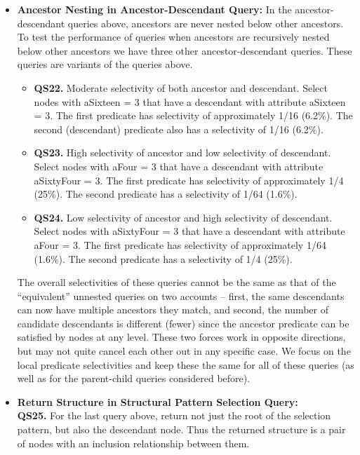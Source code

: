 \begin{itemize}
\item {\bf Ancestor Nesting in Ancestor-Descendant Query:}
In the ancestor-descendant queries above, ancestors are never nested below
other ancestors.  To test the performance of queries when ancestors are
recursively nested below other ancestors we have three other
ancestor-descendant queries.  These queries are variants of the queries
above.

\begin{itemize}
\item {\bf QS22.} Moderate selectivity of both ancestor and descendant.
Select nodes with {\sf aSixteen = 3} that have a descendant with attribute {\sf
aSixteen = 3}.  The first predicate has selectivity of approximately 1/16 (6.2\%).
The second (descendant) predicate also has a selectivity of 1/16 (6.2\%).

\item {\bf QS23.} High selectivity of ancestor and low selectivity of descendant.
Select nodes with {\sf aFour = 3} that have a descendant with attribute {\sf
aSixtyFour = 3}.  The first predicate has selectivity of approximately 1/4 (25\%).
The second predicate has a selectivity of 1/64 (1.6\%).

\item {\bf QS24.} Low selectivity of ancestor and high selectivity of descendant.
Select nodes with {\sf aSixtyFour = 3} that have a descendant with attribute
{\sf aFour = 3}.  The first predicate has selectivity of approximately 1/64 (1.6\%).
The second predicate has a selectivity of 1/4 (25\%).
\end{itemize}

The overall selectivities of these queries cannot be the same as
that of the ``equivalent'' unnested queries on two accounts --
first, the same descendants can now have multiple ancestors they
match, and second, the number of candidate descendants is
different (fewer) since the ancestor predicate can be satisfied by
nodes at any level.  These two forces work in opposite directions,
but may not quite cancel each other out in any specific case.  We
 \new{} focus on the local predicate selectivities and keep
these the same for all of these queries (as well as for the
parent-child queries considered before).

\item {\bf Return Structure in Structural Pattern Selection Query:}\\
{\bf QS25.} For the last query above, return not just the root of the selection pattern,
but also the descendant node.  Thus the returned structure is a pair of nodes
with an inclusion relationship between them.


\end{itemize}
